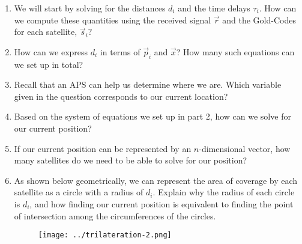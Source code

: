 \begin{enumerate}
    \item We will start by solving for the distances $d_{i}$ and the time delays $\tau_{i}.$ How can we compute these quantities using the received signal $\vec{r}$ and the Gold-Codes for each satellite, $\vec{s}_{i}?$



    \item How can we express $d_i$ in terms of $\vec{p}_i$ and $\vec{x}$? How many such equations can we set up in total?

    \answerbox{5cm}

    \sol {

    }


    \item Recall that an APS can help us determine where we are. Which variable given in the question corresponds to our current location?

    \answerbox{1cm}

    \item Based on the system of equations we set up in part 2, how can we solve for our current position?

    \answerbox{6cm}

    \item If our current position can be represented by an $n$-dimensional vector, how many satellites do we need to be able to solve for our position?

    \answerbox{1cm}

    \item As shown below geometrically, we can represent the area of coverage by each satellite as a circle with a radius of $d_i$. Explain why the radius of each circle is $d_i$, and how finding our current position is equivalent to finding the point of intersection among the circumferences of the circles.
    \begin{figure}[H]
        \centering
        \texttt{[image: ../trilateration-2.png]}
    \end{figure}


\end{enumerate}
